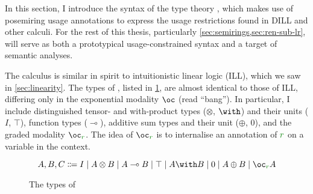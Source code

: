 In this section, I introduce the syntax of the type theory \name{}, which makes
use of posemiring usage annotations to express the usage restrictions found in
DILL and other calculi.
For the rest of this thesis, particularly
\cref{sec:semirings,sec:ren-sub-lr},
\name{} will serve as both a prototypical
usage-constrained syntax and a target of semantic analyses.

The calculus \name{} is similar in spirit to intuitionistic linear logic (ILL),
which we saw in \cref{sec:linearity}.
The types of \name{}, listed in \cref{fig:lr-types}, are almost identical
to those of ILL, differing only in the exponential modality $\oc$
(read ``bang'').
In particular, I include distinguished tensor- and with-product types
($\otimes$, $\with$) and their units ($I$, $\top$), function types
($\multimap$), additive sum types and their unit ($\oplus$, $0$), and the
graded modality $\oc_{\gr r}$.
The idea of $\oc_{\gr r}$ is to internalise an annotation of $\gr r$ on a
variable in the context.

\begin{figure}
  \begin{displaymath}
    A, B, C \Coloneqq I \mid A \otimes B \mid A \multimap B \mid \top
    \mid A \with B \mid 0 \mid A \oplus B \mid \oc_{\gr r} A
  \end{displaymath}
  \caption{The types of \name{}}
  \label{fig:lr-types}
\end{figure}

